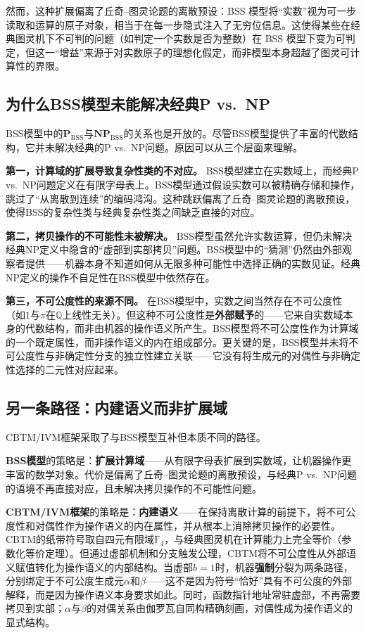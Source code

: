 \documentclass{ctexart}
\begin{document}
	然而，这种扩展偏离了丘奇–图灵论题的离散预设：BSS 模型将``实数''视为可一步读取和运算的原子对象，相当于在每一步隐式注入了无穷位信息。这使得某些在经典图灵机下不可判的问题（如判定一个实数是否为整数）在 BSS 模型下变为可判定，但这一``增益''来源于对实数原子的理想化假定，而非模型本身超越了图灵可计算性的界限。
	
	\subsection{为什么BSS模型未能解决经典P vs.\ NP}
	
	BSS模型中的$\mathbf{P}_{\text{BSS}}$与$\mathbf{NP}_{\text{BSS}}$的关系也是开放的。尽管BSS模型提供了丰富的代数结构，它并未解决经典的P vs.\ NP问题。原因可以从三个层面来理解。
	
	\textbf{第一，计算域的扩展导致复杂性类的不对应。} BSS模型建立在实数域上，而经典P vs.\ NP问题定义在有限字母表上。BSS模型通过假设实数可以被精确存储和操作，跳过了``从离散到连续''的编码鸿沟。这种跳跃偏离了丘奇–图灵论题的离散预设，使得BSS的复杂性类与经典复杂性类之间缺乏直接的对应。
	
	\textbf{第二，拷贝操作的不可能性未被解决。} BSS模型虽然允许实数运算，但仍未解决经典NP定义中隐含的``虚部到实部拷贝''问题。BSS模型中的``猜测''仍然由外部观察者提供——机器本身不知道如何从无限多种可能性中选择正确的实数见证。经典NP定义的操作不自足性在BSS模型中依然存在。
	
	\textbf{第三，不可公度性的来源不同。} 在BSS模型中，实数之间当然存在不可公度性（如$1$与$\pi$在$\mathbb{Q}$上线性无关）。但这种不可公度性是\textbf{外部赋予}的——它来自实数域本身的代数结构，而非由机器的操作语义所产生。BSS模型将不可公度性作为计算域的一个既定属性，而非操作语义的内在组成部分。更关键的是，BSS模型并未将不可公度性与非确定性分支的独立性建立关联——它没有将生成元的对偶性与非确定性选择的二元性对应起来。
	
	\subsection{另一条路径：内建语义而非扩展域}
	
	CBTM/IVM框架采取了与BSS模型互补但本质不同的路径。
	
	\textbf{BSS模型}的策略是：\textbf{扩展计算域}——从有限字母表扩展到实数域，让机器操作更丰富的数学对象。代价是偏离了丘奇–图灵论题的离散预设，与经典P vs.\ NP问题的语境不再直接对应，且未解决拷贝操作的不可能性问题。
	
	\textbf{CBTM/IVM框架}的策略是：\textbf{内建语义}——在保持离散计算的前提下，将不可公度性和对偶性作为操作语义的内在属性，并从根本上消除拷贝操作的必要性。CBTM的纸带符号取自四元有限域$\mathbb{F}_4$，与经典图灵机在计算能力上完全等价（参数化等价定理）。但通过虚部机制和分支触发公理，CBTM将不可公度性从外部语义赋值转化为操作语义的内部结构。当虚部$b=1$时，机器\textbf{强制}分裂为两条路径，分别绑定于不可公度生成元$\alpha$和$\beta$——这不是因为符号``恰好''具有不可公度的外部解释，而是因为操作语义本身要求如此。同时，函数指针地址常驻虚部，不再需要拷贝到实部；$\alpha$与$\beta$的对偶关系由伽罗瓦自同构精确刻画，对偶性成为操作语义的显式结构。
	
\end{document}
